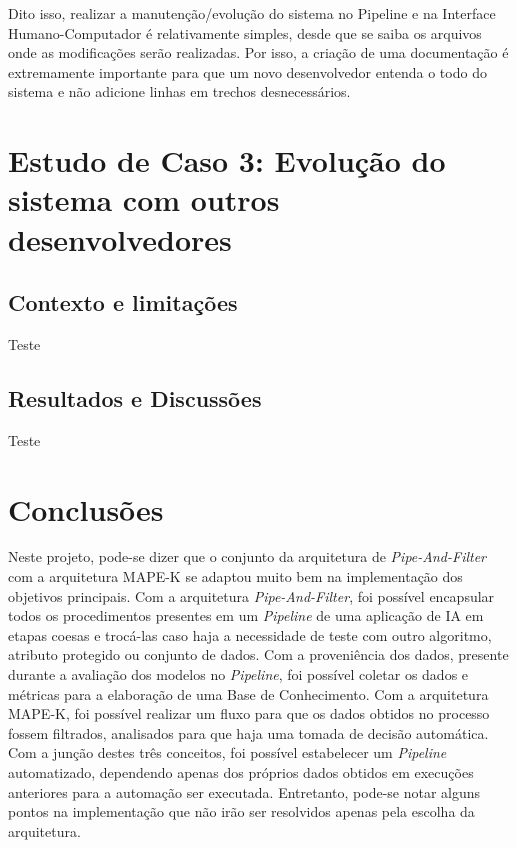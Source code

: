 \documentclass[portugues]{ic-tese}
\begin{document}
Dito isso, realizar a manutenção/evolução do sistema no Pipeline e na Interface Humano-Computador é relativamente simples, desde que se saiba os arquivos onde as modificações serão realizadas. Por isso, a criação de uma documentação é extremamente importante para que um novo desenvolvedor entenda o todo do sistema e não adicione linhas em trechos desnecessários.

\chapter{Estudo de Caso 3: Evolução do sistema com outros desenvolvedores}

\section{Contexto e limitações}

Teste

\section{Resultados e Discussões}

Teste

\chapter{Conclusões}

Neste projeto, pode-se dizer que o conjunto da arquitetura de \textit{Pipe-And-Filter} com a arquitetura MAPE-K se adaptou muito bem na implementação dos objetivos principais. Com a arquitetura \textit{Pipe-And-Filter}, foi possível encapsular todos os procedimentos presentes em um \textit{Pipeline} de uma aplicação de IA em etapas coesas e trocá-las caso haja a necessidade de teste com outro algoritmo, atributo protegido ou conjunto de dados. Com a proveniência dos dados, presente durante a avaliação dos modelos no \textit{Pipeline}, foi possível coletar os dados e métricas para a elaboração de uma Base de Conhecimento. Com a arquitetura MAPE-K, foi possível realizar um fluxo para que os dados obtidos no processo fossem filtrados, analisados para que haja uma tomada de decisão automática. Com a junção destes três conceitos, foi possível estabelecer um \textit{Pipeline} automatizado, dependendo apenas dos próprios dados obtidos em execuções anteriores para a automação ser executada. Entretanto, pode-se notar alguns pontos na implementação que não irão ser resolvidos apenas pela escolha da arquitetura.
\end{document}

